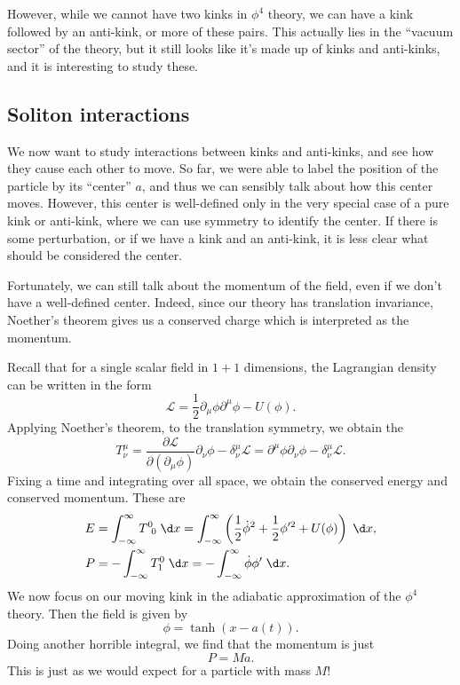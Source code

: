 \documentclass[a4paper]{article}
\begin{document}
However, while we cannot have two kinks in $\phi^4$ theory, we can have a kink followed by an anti-kink, or more of these pairs. This actually lies in the ``vacuum sector'' of the theory, but it still looks like it's made up of kinks and anti-kinks, and it is interesting to study these.

\subsection{Soliton interactions}
We now want to study interactions between kinks and anti-kinks, and see how they cause each other to move. So far, we were able to label the position of the particle by its ``center'' $a$, and thus we can sensibly talk about how this center moves. However, this center is well-defined only in the very special case of a pure kink or anti-kink, where we can use symmetry to identify the center. If there is some perturbation, or if we have a kink and an anti-kink, it is less clear what should be considered the center.

Fortunately, we can still talk about the momentum of the field, even if we don't have a well-defined center. Indeed, since our theory has translation invariance, Noether's theorem gives us a conserved charge which is interpreted as the momentum.

Recall that for a single scalar field in $1 + 1$ dimensions, the Lagrangian density can be written in the form
\[
  \mathcal{L} = \frac{1}{2} \partial_\mu \phi \partial^\mu \phi - U(\phi).
\]
Applying Noether's theorem, to the translation symmetry, we obtain the 
\[
  T^\mu_\nu = \frac{\partial \mathcal{L}}{\partial (\partial_\mu \phi)} \partial_\nu \phi - \delta^\mu_\nu \mathcal{L} = \partial^\mu \phi \partial_\nu \phi - \delta^\mu_\nu \mathcal{L}.
\]
Fixing a time and integrating over all space, we obtain the conserved energy and conserved momentum. These are
\begin{align*}
  E &= \int_{-\infty}^\infty T^0\!_0 \;\d x = \int_{-\infty}^\infty \left(\frac{1}{2}\dot{\phi}^2 + \frac{1}{2} \phi'^2 + U(\phi)\right)\;\d x,\\
  P &= - \int_{-\infty}^\infty T^0_1 \;\d x = - \int_{-\infty}^\infty \dot{\phi} \phi' \;\d x.
\end{align*}
We now focus on our moving kink in the adiabatic approximation of the $\phi^4$ theory. Then the field is given by
\[
  \phi = \tanh (x - a(t)).
\]
Doing another horrible integral, we find that the momentum is just
\[
  P = M \dot{a}.
\]
This is just as we would expect for a particle with mass $M$!
\end{document}
